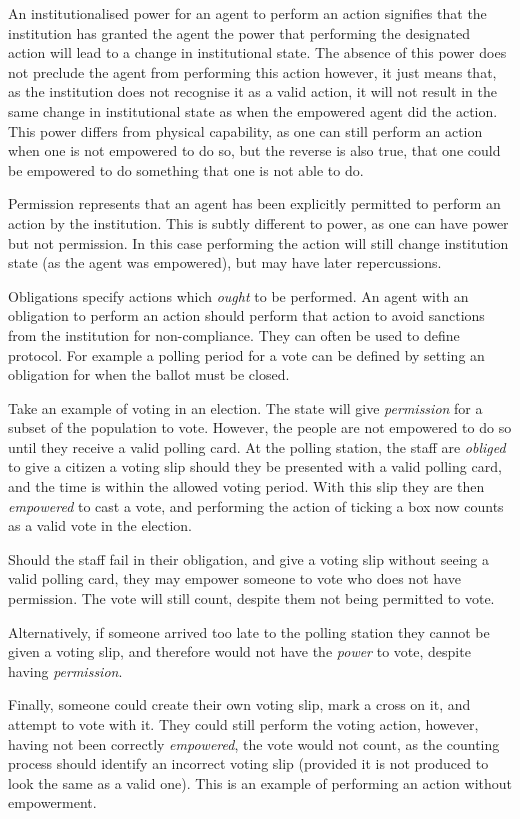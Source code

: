 An institutionalised power for an agent to perform an action signifies that
the institution has granted the agent the power that performing the designated
action will lead to a change in institutional state. The absence of this power
does not preclude the agent from performing this action however, it just means
that, as the institution does not recognise it as a valid action, it will not
result in the same change in institutional state as when the empowered agent
did the action. This power differs from physical capability, as one can still
perform an action when one is not empowered to do so, but the reverse is also
true, that one could be empowered to do something that one is not able to do.

Permission represents that an agent has been explicitly permitted to perform
an action by the institution. This is subtly different to power, as one can
have power but not permission. In this case performing the action will still
change institution state (as the agent was empowered), but may have later
repercussions.

Obligations specify actions which \emph{ought} to be performed. An agent with
an obligation to perform an action should perform that action to avoid
sanctions from the institution for non-compliance. They can often be used to
define protocol. For example a polling period for a vote can be defined by
setting an obligation for when the ballot must be closed.

Take an example of voting in an election. The state will
give \emph{permission} for a subset of the population to vote. However, the
people are not empowered to do so until they receive a valid polling card. At
the polling station, the staff are \emph{obliged} to give a citizen a voting
slip should they be presented with a valid polling card, and the time is
within the allowed voting period. With this slip they are then
\emph{empowered} to cast a vote, and performing the action of ticking a box
now counts as a valid vote in the election.

Should the staff fail in their obligation, and give a voting slip without
seeing a valid polling card, they may empower someone to vote who does not
have permission. The vote will still count, despite them not being permitted
to vote.

Alternatively, if someone arrived too late to the polling station they cannot
be given a voting slip, and therefore would not have the \emph{power} to vote,
despite having \emph{permission}.

Finally, someone could create their own voting slip, mark a cross on it, and
attempt to vote with it. They could still perform the voting action, however,
having not been correctly \emph{empowered}, the vote would not count, as the
counting process should identify an incorrect voting slip (provided it is not
produced to look the same as a valid one). This is an example of
performing an action without empowerment.

